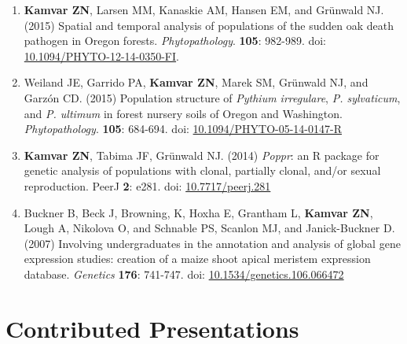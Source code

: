 \begin{enumerate}[leftmargin = 14pt]
	\vspace{6pt}

	\item \textbf{Kamvar ZN}, Larsen MM, Kanaskie AM, Hansen EM, and Gr\"unwald
	NJ. (2015) Spatial and temporal analysis of populations of the sudden oak
	death pathogen in Oregon forests. \textit{Phytopathology}. \textbf{105}:
	982-989. doi: 
	\href{http://dx.doi.org/10.1094/PHYTO-12-14-0350-FI}{10.1094/PHYTO-12-14-0350-FI}.
	
	\vspace{6pt}

	\item Weiland JE, Garrido PA, \textbf{Kamvar ZN}, Marek SM, Gr\"unwald NJ, and
	Garz\'on CD. (2015) Population structure of \textit{Pythium irregulare}, \textit{P.
	sylvaticum}, and \textit{P. ultimum} in forest nursery soils of Oregon and
	Washington. \textit{Phytopathology}. \textbf{105}: 684-694. doi: 
	\href{http://dx.doi.org/10.1094/PHYTO-05-14-0147-R}{10.1094/PHYTO-05-14-0147-R}

	\vspace{6pt}

    \item \textbf{Kamvar ZN}, Tabima JF, Gr\"unwald NJ. (2014) \textit{Poppr}: an
	R package for genetic analysis of populations with clonal, partially clonal,
	and/or sexual reproduction. PeerJ \textbf{2}: e281.
	doi: \href{http://dx.doi.org/10.7717/peerj.281}{10.7717/peerj.281}
	
	\vspace{6pt}

	\item Buckner B, Beck J, Browning, K, Hoxha E, Grantham L, \textbf{Kamvar
	ZN}, Lough A, Nikolova O, and Schnable PS, Scanlon MJ, and Janick-Buckner D.
	(2007) Involving undergraduates in the annotation and analysis of global
	gene expression studies: creation of a maize shoot apical meristem
	expression database. \textit{Genetics}
	\textbf{176}: 741-747. doi: 
	\href{http://dx.doi.org/10.1534/genetics.106.066472}{10.1534/genetics.106.066472}

\end{enumerate}



\section{Contributed Presentations}


